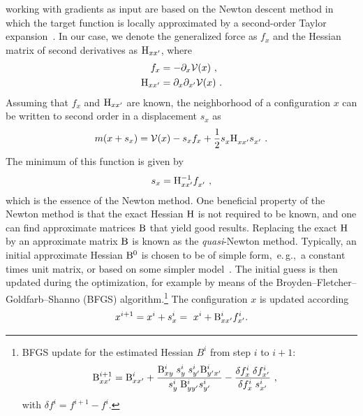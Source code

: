  working with gradients as input are based on the Newton descent method in which the target function is locally approximated by a second-order Taylor expansion~\cite{nocedal2006}. In our case, we denote the generalized force as $f_x$ and the Hessian matrix of second derivatives as ${\rm H}_{xx'}$, where
\begin{align}
f_x 
&= - \partial_x \mathcal V (x)~,
\label{eq:opt.f} \\
{\rm H}_{xx'} 
&= \partial_x \partial_{x'} \mathcal{V} (x)~.
\label{eq:opt.H}
\end{align}
Assuming that $f_x$ and ${\rm H}_{xx'}$ are known, the neighborhood of a configuration $x$ can be written to second order in a displacement $s_x$ as
\begin{align}
m(x + s_x) 
= \mathcal V (x) - s_x f_x + \halb \fD s_x \fD {\rm H}_{xx'} \fP s_{x'}~.
\label{eq:opt.m}
\end{align}
The minimum of this function is given by
\begin{align}
s_x = {\rm H}_{xx'}^{-1} \fD f_{x'}~,
\end{align}
which is the essence of the Newton method. One beneficial property of the Newton method is that the exact Hessian $\rm H$ is not required to be known, and one can find approximate matrices $\rm B$ that yield good results. Replacing the exact $\rm H$ by an approximate matrix $\rm B$ is known as the \emph{quasi}-Newton method.
Typically, an initial approximate Hessian $\rm B^0$ is chosen to be of simple form,~e.\,g.,~a constant times unit matrix, or based on some simpler model~\cite{Lindh.1995}. The initial guess is then updated during the optimization, for example by means of the  Broyden–Fletcher–Goldfarb–Shanno (BFGS) algorithm.\footnote{BFGS update for the estimated Hessian $B^i$ from step $i$ to $i+1$:
	\begin{align*}
	{\rm B}^{i + 1}_{xx'}
	= {\rm B}^i_{xx'} 
	& + \frac{{\rm B}^i_{x\fP{y}} s^i_{\fP{y}} s^i_{y'} {\rm B}^i_{y'x'} }{s^i_{\fP y} {\rm B}^i_{yy'} s^i_{y'}}
	- \frac{\delta f^i_{\fP x} \delta f^i_{x'}}{\delta f^i_{\fP x} s^i_{x'}}~,
	\end{align*}
	with $\delta f^i = f^{i+1} - f^i$.
}
The configuration $x$ is updated according
\begin{align}
x^{i+1} = x^i + s_x^i = ~x^i + {\rm B}^i_{xx'} f^i_{x'}.
\end{align}

